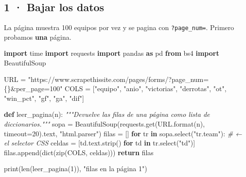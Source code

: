 \documentclass[
]{article}
\newenvironment{Shaded}{}{}
\newcommand{\BuiltInTok}[1]{\textcolor[rgb]{0.00,0.50,0.00}{#1}}
\newcommand{\CommentTok}[1]{\textcolor[rgb]{0.38,0.63,0.69}{\textit{#1}}}
\newcommand{\ControlFlowTok}[1]{\textcolor[rgb]{0.00,0.44,0.13}{\textbf{#1}}}
\newcommand{\DecValTok}[1]{\textcolor[rgb]{0.25,0.63,0.44}{#1}}
\newcommand{\ImportTok}[1]{\textcolor[rgb]{0.00,0.50,0.00}{\textbf{#1}}}
\newcommand{\KeywordTok}[1]{\textcolor[rgb]{0.00,0.44,0.13}{\textbf{#1}}}
\newcommand{\NormalTok}[1]{#1}
\newcommand{\OperatorTok}[1]{\textcolor[rgb]{0.40,0.40,0.40}{#1}}
\newcommand{\SpecialCharTok}[1]{\textcolor[rgb]{0.25,0.44,0.63}{#1}}
\newcommand{\StringTok}[1]{\textcolor[rgb]{0.25,0.44,0.63}{#1}}
\begin{document}
\subsection{1 · Bajar los datos}\label{1--bajar-los-datos}

La página muestra 100 equipos por vez y se pagina con
\texttt{?page\_num=}. Primero probamos \textbf{una} página.

\protect{}\label{I9i3q27KnYyF}
\begin{Shaded}
\begin{Highlighting}[]
\ImportTok{import}\NormalTok{ time}
\ImportTok{import}\NormalTok{ requests}
\ImportTok{import}\NormalTok{ pandas }\ImportTok{as}\NormalTok{ pd}
\ImportTok{from}\NormalTok{ bs4 }\ImportTok{import}\NormalTok{ BeautifulSoup}

\NormalTok{URL }\OperatorTok{=} \StringTok{"https://www.scrapethissite.com/pages/forms/?page\_num=}\SpecialCharTok{\{\}}\StringTok{\&per\_page=100"}
\NormalTok{COLS }\OperatorTok{=}\NormalTok{ [}\StringTok{"equipo"}\NormalTok{, }\StringTok{"anio"}\NormalTok{, }\StringTok{"victorias"}\NormalTok{, }\StringTok{"derrotas"}\NormalTok{, }\StringTok{"ot"}\NormalTok{, }\StringTok{"win\_pct"}\NormalTok{,}
        \StringTok{"gf"}\NormalTok{, }\StringTok{"ga"}\NormalTok{, }\StringTok{"dif"}\NormalTok{]}

\KeywordTok{def}\NormalTok{ leer\_pagina(n):}
    \CommentTok{"""Devuelve las filas de una página como lista de diccionarios."""}
\NormalTok{    sopa }\OperatorTok{=}\NormalTok{ BeautifulSoup(requests.get(URL.}\BuiltInTok{format}\NormalTok{(n), timeout}\OperatorTok{=}\DecValTok{20}\NormalTok{).text,}
                         \StringTok{"html.parser"}\NormalTok{)}
\NormalTok{    filas }\OperatorTok{=}\NormalTok{ []}
    \ControlFlowTok{for}\NormalTok{ tr }\KeywordTok{in}\NormalTok{ sopa.select(}\StringTok{"tr.team"}\NormalTok{):                 }\CommentTok{\# ← el selector CSS}
\NormalTok{        celdas }\OperatorTok{=}\NormalTok{ [td.text.strip() }\ControlFlowTok{for}\NormalTok{ td }\KeywordTok{in}\NormalTok{ tr.select(}\StringTok{"td"}\NormalTok{)]}
\NormalTok{        filas.append(}\BuiltInTok{dict}\NormalTok{(}\BuiltInTok{zip}\NormalTok{(COLS, celdas)))}
    \ControlFlowTok{return}\NormalTok{ filas}

\BuiltInTok{print}\NormalTok{(}\BuiltInTok{len}\NormalTok{(leer\_pagina(}\DecValTok{1}\NormalTok{)), }\StringTok{"filas en la página 1"}\NormalTok{)}
\end{Highlighting}
\end{Shaded}
\end{document}
